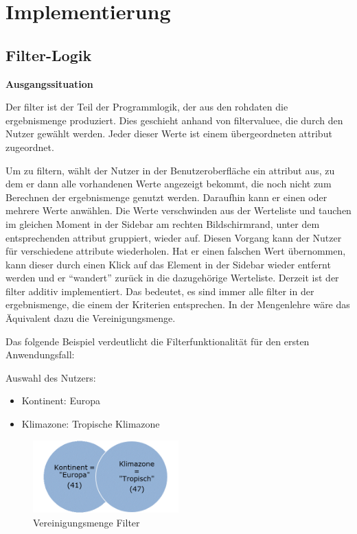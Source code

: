 \chapter{Implementierung}
\section{Filter-Logik} \label{sec:implFilter}
\textbf{Ausgangssituation}

Der \gls{filter} ist der Teil der Programmlogik, der aus den \gls{rohdaten} die \gls{ergebnismenge} produziert. Dies geschieht anhand von  \gls{filtervalue}e, die durch den Nutzer gewählt werden. Jeder dieser Werte ist einem übergeordneten \gls{attribut} zugeordnet.

Um zu filtern, wählt der Nutzer in der Benutzeroberfläche ein \gls{attribut} aus, zu dem er dann alle vorhandenen Werte angezeigt bekommt, die noch nicht zum Berechnen der \gls{ergebnismenge} genutzt werden. Daraufhin kann er einen oder mehrere Werte anwählen. Die Werte verschwinden aus der Werteliste und tauchen im gleichen Moment in der Sidebar am rechten Bildschirmrand, unter dem entsprechenden \gls{attribut} gruppiert, wieder auf. Diesen Vorgang kann der Nutzer für verschiedene \gls{attribut}e wiederholen. Hat er einen falschen Wert übernommen, kann dieser durch einen Klick auf das Element in der Sidebar wieder entfernt werden und er \enquote{wandert} zurück in die dazugehörige Werteliste.
Derzeit ist der \gls{filter} additiv implementiert. Das bedeutet, es sind immer alle \gls{filter} in der \gls{ergebnismenge}, die einem der Kriterien entsprechen. In der Mengenlehre wäre das Äquivalent dazu die Vereinigungsmenge.

Das folgende Beispiel verdeutlicht die Filterfunktionalität für den ersten Anwendungsfall:

Auswahl des Nutzers:

\begin{itemize}
	\item Kontinent: Europa
	\item Klimazone: Tropische Klimazone
\end{itemize}

\begin{figure}[H]
 \centering
 \includegraphics[width=0.5\textwidth]{grafiken/Filter_Vereinigung.png}
 \caption{Vereinigungsmenge Filter}
 \label{fig:filter1}
\end{figure}

